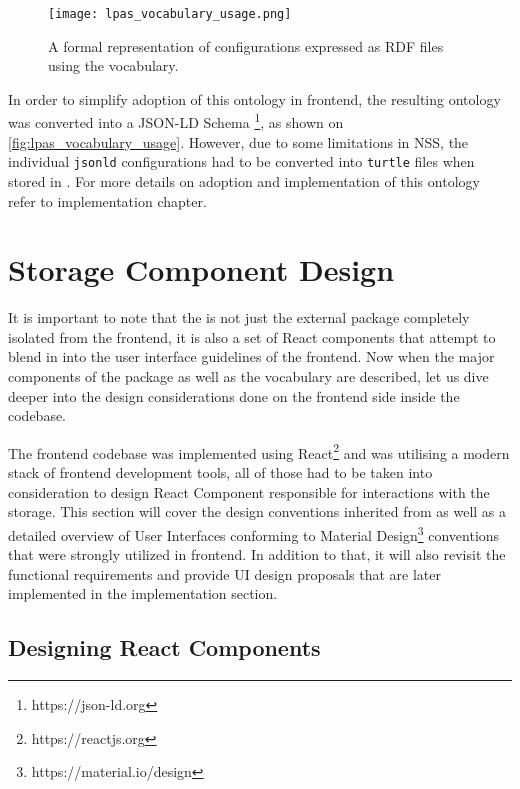\begin{figure}[h]
\centering
\texttt{[image: lpas\_vocabulary\_usage.png]}
\caption{A formal representation of \lpa{} configurations expressed as RDF files using the \lpas{} vocabulary.}
\label{fig:lpas_vocabulary_usage}
\end{figure}

In order to simplify adoption of this ontology in \lpa{} frontend, the resulting ontology was converted into a JSON-LD Schema \footnote{https://json-ld.org}, as shown on \autoref{fig:lpas_vocabulary_usage}. However, due to some limitations in NSS, the individual \texttt{jsonld} configurations had to be converted into \texttt{turtle} files when stored in \solid{}. For more details on adoption and  implementation of this ontology refer to implementation chapter.


\section{Storage Component Design}
\label{ssec:lpas_storage_component_design}

It is important to note that the \lpas{} is not just the external package completely isolated from the \lpa{} frontend, it is also a set of React components that attempt to blend in into the user interface guidelines of the frontend. Now when the major components of the \lpas{} package as well as the \lpas{} vocabulary are described, let us dive deeper into the design considerations done on the frontend side inside the \lpa{} codebase. 

The \lpa{} frontend codebase was implemented using React\footnote{https://reactjs.org} and was utilising a modern stack of frontend development tools, all of those had to be taken into consideration to design React Component responsible for interactions with the storage. This section will cover the design conventions inherited from \lpa{} as well as a detailed overview of User Interfaces conforming to Material Design\footnote{https://material.io/design} conventions that were strongly utilized in \lpa{} frontend. In addition to that, it will also revisit the functional requirements and provide UI design proposals that are later implemented in the implementation section.

\subsection{Designing React Components}

